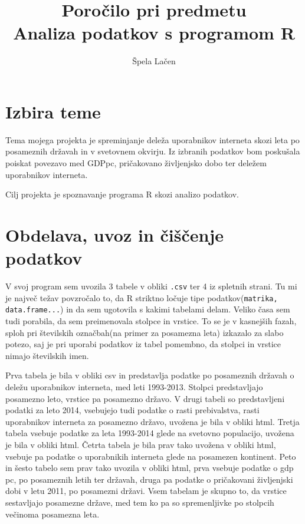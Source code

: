 \documentclass[11pt,a4paper]{article}
\begin{document}
\author{Špela Lačen}
\title{Poročilo pri predmetu \\
Analiza podatkov s programom R}
\maketitle

\section{Izbira teme}

Tema mojega projekta je spreminjanje deleža uporabnikov interneta skozi leta po posameznih državah in v svetovnem okvirju. Iz izbranih podatkov bom poskušala poiskat povezavo med  GDPpc, pričakovano življenjsko dobo ter deležem uporabnikov interneta. 

\bigskip 
Cilj projekta je spoznavanje programa R skozi analizo podatkov.

\section{Obdelava, uvoz in čiščenje podatkov}

V svoj program sem uvozila 3 tabele  v obliki \verb|.csv| ter 4 iz spletnih strani. Tu mi je največ težav povzročalo to, da R striktno ločuje tipe podatkov\-(\verb|matrika, data.frame...|) in da sem ugotovila s kakimi tabelami delam. Veliko časa sem tudi porabila, da sem preimenovala stolpce in vrstice. To se je v kasnejših fazah, sploh pri številskih označbah(na primer za posamezna leta) izkazalo za slabo potezo, saj je pri uporabi podatkov iz tabel pomembno, da stolpci in vrstice nimajo številskih imen. 

Prva tabela je bila v obliki csv in predstavlja podatke po posameznih državah o deležu uporabnikov interneta, med leti 1993-2013. Stolpci predstavljajo posamezno leto, vrstice pa posamezno državo.
V drugi tabeli so predstavljeni podatki za leto 2014, vsebujejo tudi podatke o rasti prebivalstva, rasti uporabnikov interneta za posamezno državo, uvožena je bila v obliki html.
Tretja tabela vsebuje podatke za leta 1993-2014 glede na svetovno populacijo, uvožena je bila v obliki html.
Četrta tabela je bila prav tako uvožena v obliki html, vsebuje pa podatke o uporabnikih interneta glede na posamezen kontinent. Peto in šesto tabelo sem prav tako uvozila v obliki html, prva vsebuje podatke o gdp pc, po posameznih letih ter državah, druga pa podatke o pričakovani življenjski dobi v letu 2011, po posamezni državi.
Vsem tabelam je skupno to, da vrstice sestavljajo posamezne države, med tem ko pa so spremenljivke po stolpcih večinoma posamezna leta.
\end{document}
